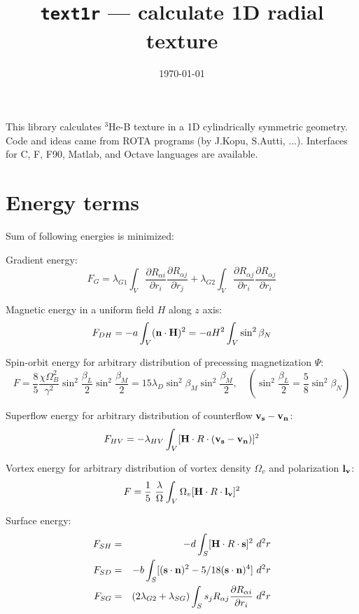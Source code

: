 \documentclass[a4paper]{article}
\begin{document}
\title{{\tt text1r} --- calculate 1D radial texture}
\date{\today}
\author{}
\maketitle

\def\sp{\sqrt{5}}
\def\st{\sqrt{3}}
\def\ddd#1#2{\frac{\partial #1}{\partial #2}}

This library calculates $^3$He-B texture in a 1D cylindrically
symmetric geometry. Code and ideas came from ROTA programs (by J.Kopu,
S.Autti, ...). Interfaces for C, F, F90, Matlab, and Octave languages
are available.

\section*{Energy terms}

Sum of following energies is minimized:

\def\bn{{\bf n}}
\def\bH{{\bf H}}
\def\divn{(\nabla\cdot\bn)}
\def\rotn{(\nabla\times\bn)}
\def\grn{\nabla\bn}

Gradient energy:
$$
F_{G}  = \lambda_{G1}\int_V
  \frac{\partial R_{\alpha i}}{\partial r_i}
  \frac{\partial R_{\alpha j}}{\partial r_j}
       + \lambda_{G2}\int_V
  \frac{\partial R_{\alpha j}}{\partial r_i}
  \frac{\partial R_{\alpha j}}{\partial r_i}
$$

Magnetic energy in a uniform field $H$ along $z$ axis:
$$
F_{DH} = - a \int_V (\bn\cdot\bH)^2 = -a H^2 \int_V \sin^2\beta_N
$$

Spin-orbit energy for arbitrary distribution of precessing magnetization $\Psi$:
$$
F = \frac85\frac{\chi\Omega_B^2}{\gamma^2} \sin^2\frac{\beta_L}{2} \sin^2\frac{\beta_M}{2} =
15\lambda_D \sin^2\beta_M \sin^2\frac{\beta_M}{2},\quad
\left(\sin^2\frac{\beta_L}{2} = \frac58\sin^2\beta_N\right)
$$

Superflow energy for arbitrary distribution of counterflow ${\bf v_s-v_n}$:
$$
F_{HV} = - \lambda_{HV} \int_V [\bH \cdot R \cdot ({\bf v_s-v_n})]^2
$$

Vortex energy for arbitrary distribution of vortex density $\Omega_v$
and polarization ${\bf l_v}$:
$$
F = \frac15\ \frac{\lambda}{\Omega} \int_V  \Omega_v [\bH \cdot R \cdot {\bf l_v}]^2
$$

Surface energy:
\begin{eqnarray*}
F_{SH} &=& -d
  \int_S [{\bf H} \cdot R \cdot {\bf s} ]^2\ d^2r\\
F_{SD} &=& -b
  \int_S [({\bf s}\cdot{\bf n})^2 - 5/18 ({\bf s}\cdot{\bf n})^4]\ d^2r\\
F_{SG} &=& (2\lambda_{G2} + \lambda_{SG})
  \int_S s_j R_{\alpha j}
    \frac{\partial R_{\alpha i}}{\partial r_i}\ d^2r\\
\end{eqnarray*}
\end{document}
